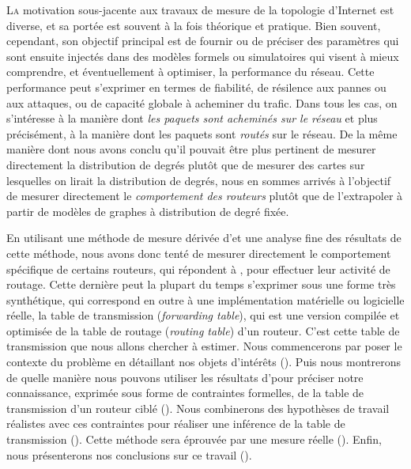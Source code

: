 \label{chap:revtables}
\introformatting

\lettrine{L}{a} motivation sous-jacente aux travaux de mesure de la topologie
d'Internet est diverse, et sa portée est souvent à la fois théorique et
pratique. Bien souvent, cependant, son objectif principal est de fournir ou de
préciser des paramètres qui sont ensuite injectés dans des modèles formels ou
simulatoires qui visent à mieux comprendre, et éventuellement à optimiser, la
performance du réseau. Cette performance peut s'exprimer en termes de fiabilité,
de résilence aux pannes ou aux attaques, ou de capacité globale à acheminer du
trafic. Dans tous les cas, on s'intéresse à la manière dont {\em les paquets
sont acheminés sur le réseau} et plus précisément, à la manière dont les paquets
sont {\em routés} sur le réseau. De la même manière dont nous avons conclu qu'il
pouvait être plus pertinent de mesurer directement la distribution de degrés
plutôt que de mesurer des cartes sur lesquelles on lirait la distribution de
degrés, nous en sommes arrivés à l'objectif de mesurer directement le {\em
comportement des routeurs} plutôt que de l'extrapoler à partir de modèles de
graphes à distribution de degré fixée.

En utilisant une méthode de mesure dérivée d'\udpping et une analyse fine des
résultats de cette méthode, nous avons donc tenté de mesurer
directement le comportement spécifique de certains routeurs, qui répondent à
\udpping, pour effectuer leur activité de routage. Cette dernière peut la
plupart du temps s'exprimer sous une forme très synthétique, qui correspond en
outre à une implémentation matérielle ou logicielle réelle, la table de
transmission ({\em forwarding table}), qui est une version compilée et optimisée
de la table de routage ({\em routing table}) d'un routeur. C'est cette table de
transmission que nous allons chercher à estimer. Nous commencerons par poser le
contexte du problème en détaillant nos objets d'intérêts
(). Puis nous montrerons de quelle manière nous
pouvons utiliser les résultats d'\udpping pour préciser notre connaissance,
exprimée sous forme de contraintes formelles, de la table de transmission d'un
routeur ciblé (). Nous combinerons des hypothèses
de travail réalistes avec ces contraintes pour réaliser une inférence de la
table de transmission (). Cette méthode sera
éprouvée par une mesure réelle (). Enfin, nous
présenterons nos conclusions sur ce travail ().

